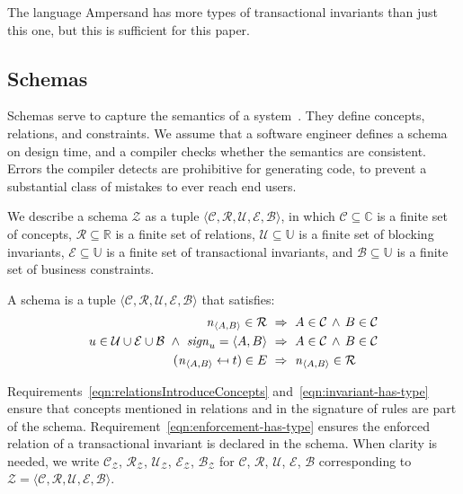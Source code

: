 \documentclass[runningheads]{llncs}
\newcommand{\id}[1]{\text{\it #1\/}}
\newcommand{\sign}[1]{\id{sign}_{#1}}
\newcommand{\declare}[3]{\id{#1}_{\pair{#2}{#3}}}
\newcommand{\pair}[2]{\langle{#1},{#2}\rangle}
\newcommand{\quintuple}[5]{\langle{#1},{#2},{#3},{#4},{#5}\rangle}
\newcommand{\concepts}{\mathcal{C}}
\newcommand{\Concepts}{\mathbb{C}}
\newcommand{\rels}{\mathcal{R}}   %
\newcommand{\Rels}{\mathbb{R}}   %
\newcommand{\rules}{\mathcal{U}}
\newcommand{\transactions}{\mathcal{E}}
\newcommand{\busConstraints}{\mathcal{B}}
\newcommand{\Constraints}{\mathbb{U}}
\newcommand{\schema}{\mathscr{Z}}
\begin{document}
   The language Ampersand has more types of transactional invariants than just this one,
   but this is sufficient for this paper.

\subsection{Schemas}
\label{sct:Schemas}
   Schemas serve to capture the semantics of a system~\cite{Spivak2012}.
   They define concepts, relations, and constraints.
   We assume that a software engineer defines a schema on design time, and a compiler checks whether the semantics are consistent.
   Errors the compiler detects are prohibitive for generating code,
   to prevent a substantial class of mistakes to ever reach end users.

   We describe a schema $\schema$ as a tuple $\quintuple{\concepts}{\rels}{\rules}{\transactions}{\busConstraints}$,
   in which $\concepts\subseteq\Concepts$ is a finite set of concepts,
   $\rels\subseteq\Rels$ is a finite set of relations,
   $\rules\subseteq\Constraints$ is a finite set of blocking invariants,
   $\transactions\subseteq\Constraints$ is a finite set of transactional invariants,
   and $\busConstraints\subseteq\Constraints$ is a finite set of business constraints.

   \begin{definition}[Schema]
   A schema is a tuple $\quintuple{\concepts}{\rels}{\rules}{\transactions}{\busConstraints}$ that satisfies:
\begin{align}
   \declare{n}{A}{B}\in\rels&~\Rightarrow~ A\in\concepts\,\wedge\, B\in\concepts
   \label{eqn:relationsIntroduceConcepts}\\
   u\in\rules\cup\transactions\cup\busConstraints\ \wedge\ \sign{u}=\pair{A}{B}&~\Rightarrow~A\in\concepts\,\wedge\, B\in\concepts\label{eqn:invariant-has-type}\\
   (\declare{n}{A}{B}\mapsfrom t)\in\mathcal\transactions&~\Rightarrow~ \declare{n}{A}{B}\in \rels\label{eqn:enforcement-has-type}
\end{align}
   \end{definition}
   Requirements~\ref{eqn:relationsIntroduceConcepts} and~\ref{eqn:invariant-has-type} ensure that concepts mentioned in relations and in the signature of rules are part of the schema.
   Requirement~\ref{eqn:enforcement-has-type} ensures the enforced relation of a transactional invariant is declared in the schema. 
   When clarity is needed, we write $\concepts_{\schema}$, $\rels_{\schema}$, $\rules_{\schema}$, $\transactions_{\schema}$, $\busConstraints_{\schema}$
   for $\concepts$, $\rels$, $\rules$, $\transactions$, $\busConstraints$ corresponding to $\schema = \quintuple{\concepts}{\rels}{\rules}{\transactions}{\busConstraints}$.
\end{document}

